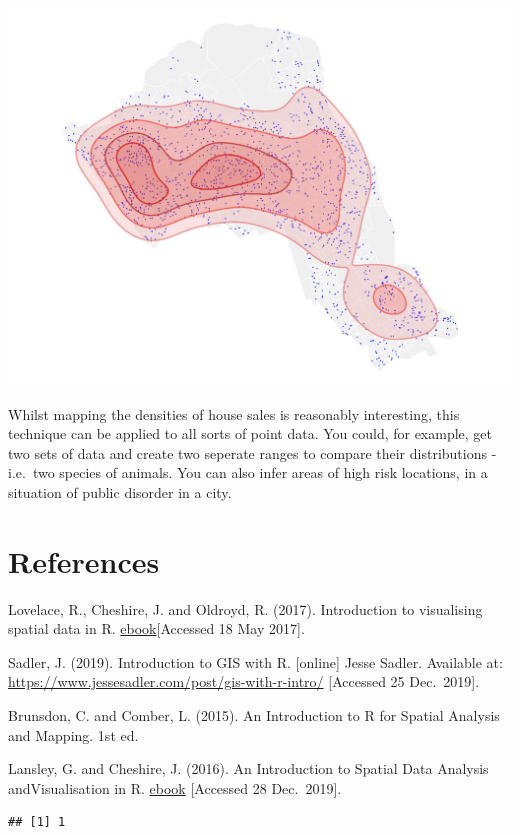 \documentclass[]{article}
\begin{document}
\includegraphics{TutorialNotebook_files/figure-latex/unnamed-chunk-35-1.pdf}

Whilst mapping the densities of house sales is reasonably interesting,
this technique can be applied to all sorts of point data. You could, for
example, get two sets of data and create two seperate ranges to compare
their distributions - i.e.~two species of animals. You can also infer
areas of high risk locations, in a situation of public disorder in a
city.

\hypertarget{references}{%
\section{References}\label{references}}

Lovelace, R., Cheshire, J. and Oldroyd, R. (2017). Introduction to
visualising spatial data in R.
\href{https://github.com/Robinlovelace/Creating-maps-in-R}{ebook}{[}Accessed
18 May 2017{]}.

Sadler, J. (2019). Introduction to GIS with R. {[}online{]} Jesse
Sadler. Available at:
\url{https://www.jessesadler.com/post/gis-with-r-intro/} {[}Accessed 25
Dec.~2019{]}.

Brunsdon, C. and Comber, L. (2015). An Introduction to R for Spatial
Analysis and Mapping. 1st ed.

Lansley, G. and Cheshire, J. (2016). An Introduction to Spatial Data
Analysis andVisualisation in R.
\href{http://www.spatialanalysisonline.com/An\%20Introduction\%20to\%20Spatial\%20Data\%20Analysis\%20in\%20R.pdf}{ebook}
{[}Accessed 28 Dec.~2019{]}.

\begin{verbatim}
## [1] 1
\end{verbatim}
\end{document}
